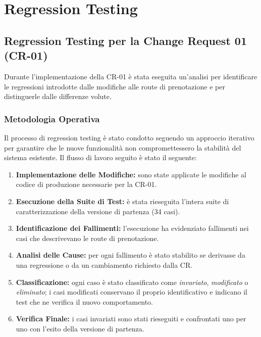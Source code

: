 \documentclass[11pt,a4paper,oneside,openany]{book}
\begin{document}
\frontmatter
\copertina
\tableofcontents
\listoftables

\mainmatter
\chapter{Regression Testing}

\section{Regression Testing per la Change Request 01 (CR-01)}

Durante l'implementazione della CR-01 è stata eseguita un'analisi per
identificare le regressioni introdotte dalle modifiche alle route di
prenotazione e per distinguerle dalle differenze volute.

\subsection{Metodologia Operativa}

Il processo di regression testing è stato condotto seguendo un approccio
iterativo per garantire che le nuove funzionalità non compromettessero la
stabilità del sistema esistente. Il flusso di lavoro seguito è stato il
seguente:
\begin{enumerate}
  \item \textbf{Implementazione delle Modifiche:} sono state applicate le
        modifiche al codice di produzione necessarie per la CR-01.
  \item \textbf{Esecuzione della Suite di Test:} è stata rieseguita l'intera
        suite di caratterizzazione della versione di partenza (34 casi).
  \item \textbf{Identificazione dei Fallimenti:} l'esecuzione ha evidenziato
        fallimenti nei casi che descrivevano le route di prenotazione.
  \item \textbf{Analisi delle Cause:} per ogni fallimento è stato stabilito se
        derivasse da una regressione o da un cambiamento richiesto dalla CR.
  \item \textbf{Classificazione:} ogni caso è stato classificato come
        \emph{invariato}, \emph{modificato} o \emph{eliminato}; i casi
        modificati conservano il proprio identificativo e indicano il test che
        ne verifica il nuovo comportamento.
  \item \textbf{Verifica Finale:} i casi invariati sono stati rieseguiti e
        confrontati uno per uno con l'esito della versione di partenza.
\end{enumerate}
\end{document}
